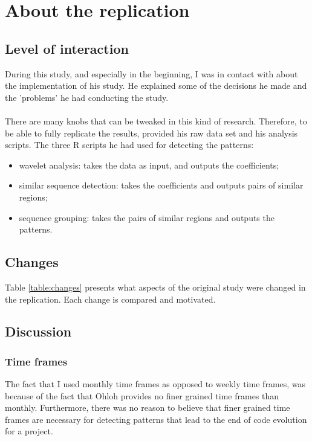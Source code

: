 \section*{About the replication}
\subsection*{Level of interaction}
During this study, and especially in the beginning, I was in contact with
\citeauthor{karus2013} about the implementation of his study. He explained some
of the decisions he made and the 'problems' he had conducting the study.

\paragraph{}
There are many knobs that can be tweaked in this kind of research. Therefore, to
be able to  fully replicate the results, \citeauthor{karus2013} provided his
raw data set and his analysis scripts. The three R scripts he had used for
detecting the patterns:
\begin{itemize}
	\item wavelet analysis: takes the data as input, and outputs
		the coefficients;

	\item similar sequence detection: takes the coefficients and
		outputs pairs of similar regions;

	\item sequence grouping: takes the pairs of similar regions and outputs the
		patterns.
\end{itemize}

\subsection*{Changes}
Table \ref{table:changes} presents what aspects of the original study were
changed in the replication. Each change is compared and motivated.



\subsection*{Discussion}
\subsubsection*{Time frames}
The fact that I used monthly time frames as opposed to weekly time frames, was
because of the fact that Ohloh provides no finer grained time frames than
monthly. Furthermore, there was no reason to believe that finer grained time
frames are necessary for detecting patterns that lead to the end of code
evolution for a project.

